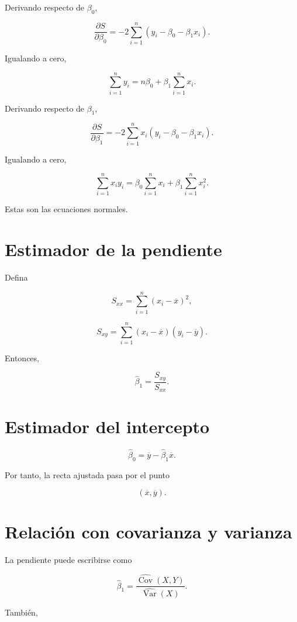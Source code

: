 \documentclass[
  spanish,
  11pt,
  letterpaper,
  DIV=11,
  numbers=noendperiod]{scrreprt}
\theoremstyle{definition}
\theoremstyle{plain}
\theoremstyle{definition}
\theoremstyle{remark}
\begin{document}
Derivando respecto de \(\beta_0\),

\[
\frac{\partial S}{\partial\beta_0}
=
-2
\sum_{i=1}^{n}
\left(
y_i-\beta_0-\beta_1x_i
\right).
\]

Igualando a cero,

\[
\sum_{i=1}^{n}
y_i
=
n\beta_0
+
\beta_1
\sum_{i=1}^{n}
x_i.
\]

Derivando respecto de \(\beta_1\),

\[
\frac{\partial S}{\partial\beta_1}
=
-2
\sum_{i=1}^{n}
x_i
\left(
y_i-\beta_0-\beta_1x_i
\right).
\]

Igualando a cero,

\[
\sum_{i=1}^{n}
x_iy_i
=
\beta_0
\sum_{i=1}^{n}
x_i
+
\beta_1
\sum_{i=1}^{n}
x_i^2.
\]

Estas son las ecuaciones normales.

\section{Estimador de la pendiente}\label{estimador-de-la-pendiente}

Defina

\[
S_{xx}
=
\sum_{i=1}^{n}
(x_i-\overline{x})^2,
\]

\[
S_{xy}
=
\sum_{i=1}^{n}
(x_i-\overline{x})(y_i-\overline{y}).
\]

Entonces,

\[
\widehat{\beta}_1
=
\frac{S_{xy}}{S_{xx}}.
\]

\section{Estimador del intercepto}\label{estimador-del-intercepto}

\[
\widehat{\beta}_0
=
\overline{y}
-
\widehat{\beta}_1\overline{x}.
\]

Por tanto, la recta ajustada pasa por el punto

\[
(\overline{x},\overline{y}).
\]

\section{Relación con covarianza y
varianza}\label{relaciuxf3n-con-covarianza-y-varianza}

La pendiente puede escribirse como

\[
\widehat{\beta}_1
=
\frac{
\widehat{\operatorname{Cov}}(X,Y)
}{
\widehat{\operatorname{Var}}(X)
}.
\]

También,
\end{document}

